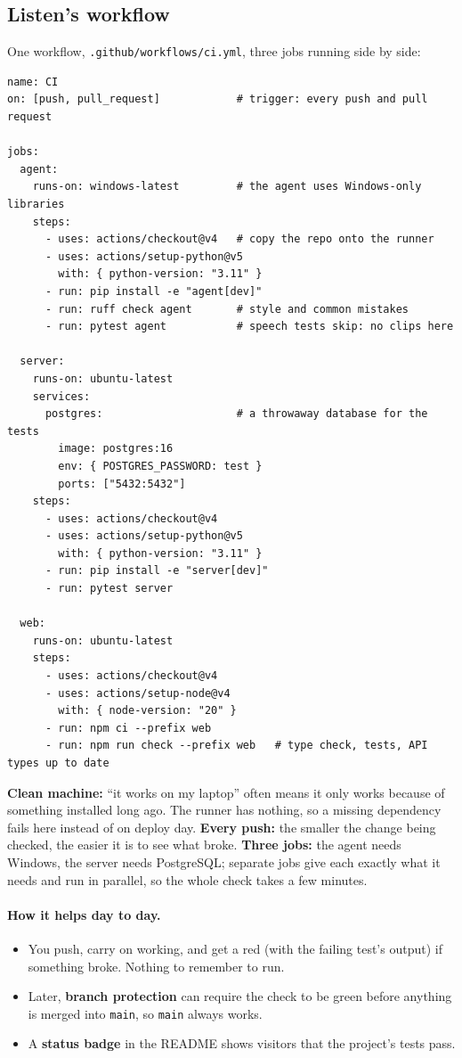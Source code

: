 \documentclass[11pt,a4paper]{article}
\begin{document}
\subsection{Listen's workflow}
One workflow, \texttt{.github/workflows/ci.yml}, three jobs running side by side:
\begin{lstlisting}
name: CI
on: [push, pull_request]            # trigger: every push and pull request

jobs:
  agent:
    runs-on: windows-latest         # the agent uses Windows-only libraries
    steps:
      - uses: actions/checkout@v4   # copy the repo onto the runner
      - uses: actions/setup-python@v5
        with: { python-version: "3.11" }
      - run: pip install -e "agent[dev]"
      - run: ruff check agent       # style and common mistakes
      - run: pytest agent           # speech tests skip: no clips here

  server:
    runs-on: ubuntu-latest
    services:
      postgres:                     # a throwaway database for the tests
        image: postgres:16
        env: { POSTGRES_PASSWORD: test }
        ports: ["5432:5432"]
    steps:
      - uses: actions/checkout@v4
      - uses: actions/setup-python@v5
        with: { python-version: "3.11" }
      - run: pip install -e "server[dev]"
      - run: pytest server

  web:
    runs-on: ubuntu-latest
    steps:
      - uses: actions/checkout@v4
      - uses: actions/setup-node@v4
        with: { node-version: "20" }
      - run: npm ci --prefix web
      - run: npm run check --prefix web   # type check, tests, API types up to date
\end{lstlisting}

\begin{why}
\textbf{Clean machine:} ``it works on my laptop'' often means it only works because of something
installed long ago. The runner has nothing, so a missing dependency fails here instead of on
deploy day. \textbf{Every push:} the smaller the change being checked, the easier it is to see
what broke. \textbf{Three jobs:} the agent needs Windows, the server needs PostgreSQL; separate
jobs give each exactly what it needs and run in parallel, so the whole check takes a few minutes.
\end{why}

\paragraph{How it helps day to day.}
\begin{itemize}[nosep]
  \item You push, carry on working, and get a red \texttimes{} (with the failing test's output) if
        something broke. Nothing to remember to run.
  \item Later, \textbf{branch protection} can require the check to be green before anything is
        merged into \texttt{main}, so \texttt{main} always works.
  \item A \textbf{status badge} in the README shows visitors that the project's tests pass.
\end{itemize}
\end{document}
